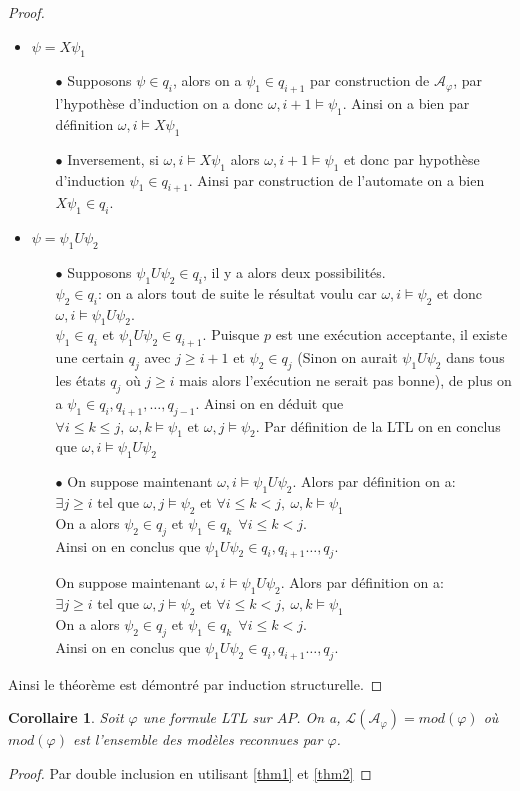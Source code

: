 \documentclass[12pt,a4paper]{article}
\theoremstyle{plain}
\newtheorem{cor}[thm]{Corollaire}
\theoremstyle{definition}
\begin{document}
\begin{proof}
\begin{itemize}
\begin{itemize}
 		\end{itemize}
		\item $\psi = X\psi_1$
		\begin{itemize}
			\item[$\bullet$] Supposons $\psi \in q_i$, alors on a $\psi_1 \in q_{i+1}$ par construction de $\mathcal{A}_\varphi$, par l'hypothèse d'induction on a donc $\omega, i+1 \models \psi_1$. Ainsi on a bien par définition $\omega, i \models X\psi_1$
			\item[$\bullet$] Inversement, si $\omega, i \models X\psi_1$ alors $\omega, i+1 \models \psi_1$ et donc par hypothèse d'induction $\psi_1 \in q_{i+1}$. Ainsi par construction de l'automate on a bien $X\psi_1 \in q_i$. 
		\end{itemize}
		\item $\psi = \psi_1 U \psi_2$
		\begin{itemize}
			\item[$\bullet$] Supposons $\psi_1 U \psi_2 \in q_i$, il y a alors deux possibilités.\\
				$\psi_2 \in q_i$: on a alors tout de suite le résultat voulu car $\omega, i \models \psi_2$ et donc $\omega, i \models \psi_1 U \psi_2$. \\
				$\psi_1 \in q_i$ et $\psi_1 U \psi_2 \in q_{i+1}$. Puisque $p$ est une exécution acceptante, il existe une certain $q_j$ avec $j \geq i+1$ et $\psi_2 \in q_j$ (Sinon on aurait $\psi_1 U \psi_2$ dans tous les états $q_j$ où $j \geq i$ mais alors l'exécution ne serait pas bonne), de plus on a $\psi_1 \in q_i,q_{i+1},\dots,q_{j-1}$. Ainsi on en déduit que $\forall i \leq k \leq j , \: \omega, k \models \psi_1 \textrm{ et } \omega, j \models \psi_2$. Par définition de la LTL on en conclus que $\omega, i \models \psi_1 U \psi_2$
			\item[$\bullet$] On suppose maintenant $\omega, i \models \psi_1 U \psi_2$. Alors par définition on a:\\
			$\exists j \geq i$ tel que $\omega, j \models \psi_2$ et $\forall i \leq k < j, \: \omega, k \models \psi_1$\\
			On a alors $\psi_2 \in q_j$ et $\psi_1 \in q_k \:\: \forall i \leq k < j$. \\
			Ainsi on en conclus que $\psi_1 U \psi_2 \in q_i, q_{i+1} \dots, q_j$.
			\item[] On suppose maintenant $\omega, i \models \psi_1 U \psi_2$. Alors par définition on a:\\
			$\exists j \geq i$ tel que $\omega, j \models \psi_2$ et $\forall i \leq k < j, \: \omega, k \models \psi_1$\\
			On a alors $\psi_2 \in q_j$ et $\psi_1 \in q_k \:\: \forall i \leq k < j$. \\
			Ainsi on en conclus que $\psi_1 U \psi_2 \in q_i, q_{i+1} \dots, q_j$.  
		\end{itemize}
	\end{itemize}
	Ainsi le théorème est démontré par induction structurelle.
\end{proof}
\begin{cor}
	Soit $\varphi$ une formule LTL sur $AP$. On a, $\mathcal{L}(\mathcal{A}_\varphi)=mod(\varphi)$ où $mod(\varphi)$ est l'ensemble des modèles reconnues par $\varphi$.
\end{cor}
\begin{proof}
	Par double inclusion en utilisant \cref{thm1} et \cref{thm2}
\end{proof}
\end{document}
